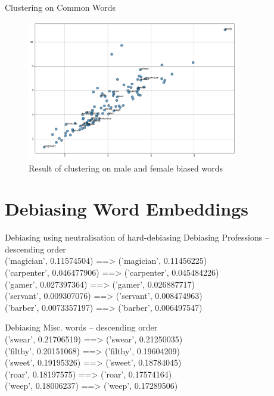 \documentclass{beamer}
\begin{document}
	\begin{frame}{Clustering on Common Words}
		\vspace{3mm}
		\begin{figure}[H]
			\centerline{\includegraphics[width=25em]{biased_misc.png}}
			\caption{Result of clustering on male and female biased words}
			\label{common-cluster-fig}
		\end{figure}
	\end{frame}

	\section{Debiasing Word Embeddings}
		\begin{frame}{Debiasing using neutralisation of hard-debiasing}		
			Debiasing Professions -- descending order \\
			('magician', 0.11574504) ==> ('magician', 0.11456225)
\\
			('carpenter', 0.046477906) ==> ('carpenter', 0.045484226) \\
			('gamer', 0.027397364) ==> ('gamer', 0.026887717)
\\
			('servant', 0.009307076) ==> ('servant', 0.008474963)
\\
			('barber', 0.0073357197) ==> ('barber', 0.006497547)
			
			
			Debiasing Misc. words -- descending order
\\
			
			('swear', 0.21706519) ==> ('swear', 0.21250035)
\\
			('filthy', 0.20151068) ==> ('filthy', 0.19604209)
 \\
			('sweet', 0.19195326) ==> ('sweet', 0.18784045)
\\
			('roar', 0.18197575) ==> ('roar', 0.17574164)
\\
			('weep', 0.18006237) ==> ('weep', 0.17289506)
\\
			
			
		\end{frame}
	
\end{document}
